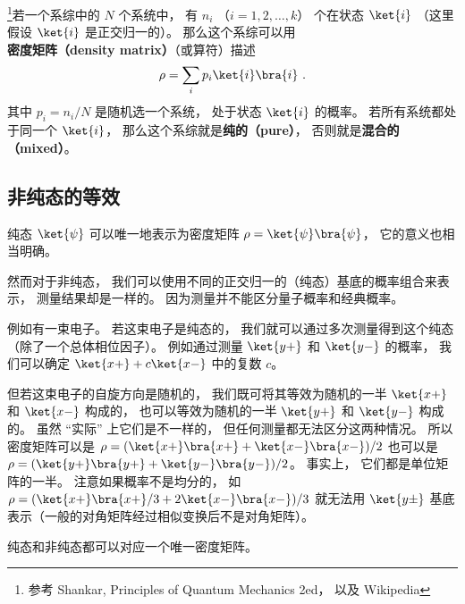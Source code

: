 

\footnote{参考 Shankar, Principles of Quantum Mechanics 2ed， 以及 Wikipedia}若一个系综中的 $N$ 个系统中， 有 $n_i$ （$i = 1,2,\dots,k$） 个在状态 $\ket{i}$ （这里假设 $\ket{i}$ 是正交归一的）。 那么这个系综可以用\textbf{密度矩阵（density matrix）}（或算符）描述
\begin{equation}\label{eq_denMat_1}
\rho = \sum_i p_i\ket{i}\bra{i}   ~.
\end{equation}
其中 $p_i = n_i/N$ 是随机选一个系统， 处于状态 $\ket{i}$ 的概率。 若所有系统都处于同一个 $\ket{i}$， 那么这个系综就是\textbf{纯的（pure）}， 否则就是\textbf{混合的（mixed）}。

\subsection{非纯态的等效}
纯态 $\ket{\psi}$ 可以唯一地表示为密度矩阵 $\rho = \ket{\psi}\bra{\psi}$， 它的意义也相当明确。

然而对于非纯态， 我们可以使用不同的正交归一的（纯态）基底的概率组合来表示， 测量结果却是一样的。 因为测量并不能区分量子概率和经典概率。

例如有一束电子。 若这束电子是纯态的， 我们就可以通过多次测量得到这个纯态（除了一个总体相位因子）。 例如通过测量 $\ket{y+}$ 和 $\ket{y-}$ 的概率， 我们可以确定 $\ket{x+} + c\ket{x-}$ 中的复数 $c$。

但若这束电子的自旋方向是随机的， 我们既可将其等效为随机的一半 $\ket{x+}$ 和 $\ket{x-}$ 构成的， 也可以等效为随机的一半 $\ket{y+}$ 和 $\ket{y-}$ 构成的。 虽然 “实际” 上它们是不一样的， 但任何测量都无法区分这两种情况。 所以密度矩阵可以是 $\rho = (\ket{x+}\bra{x+} + \ket{x-}\bra{x-})/2$ 也可以是 $\rho = (\ket{y+}\bra{y+} + \ket{y-}\bra{y-})/2$。 事实上， 它们都是单位矩阵的一半。 注意如果概率不是均分的， 如 $\rho = (\ket{x+}\bra{x+}/3 + 2\ket{x-}\bra{x-})/3$ 就无法用 $\ket{y\pm}$ 基底表示（一般的对角矩阵经过相似变换后不是对角矩阵）。

纯态和非纯态都可以对应一个唯一密度矩阵。

